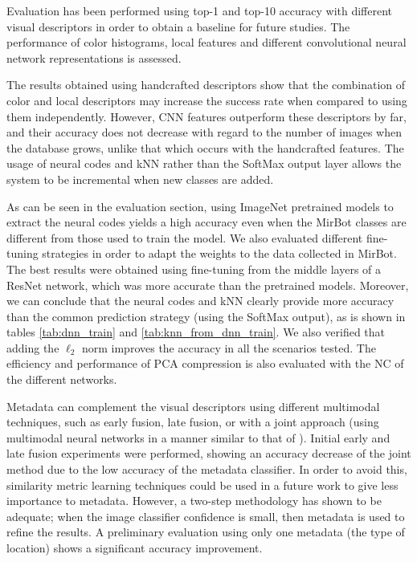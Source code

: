 \documentclass[final, twocolumn]{elsarticle}
\begin{document}
Evaluation has been performed using top-1 and top-10 accuracy with different visual descriptors in order to obtain a baseline for future studies. The performance of color histograms, local features and different convolutional neural network representations is assessed. 

The results obtained using handcrafted descriptors show that the combination of color and local descriptors may increase the success rate  when compared to using them independently. However, CNN features outperform these descriptors by far, and their accuracy does not decrease with regard to the number of images when the database grows, unlike that which occurs with the handcrafted features.  The usage of neural codes and kNN rather than the SoftMax output layer allows the system to be incremental when new classes are added. 

As can be seen in the evaluation section, using ImageNet pretrained models to extract the neural codes yields a high accuracy even when the MirBot classes are different from those used to train the model. We also evaluated different fine-tuning strategies in order to adapt the weights to the data collected in MirBot. The best results were obtained using fine-tuning from the middle layers of a ResNet network, which was more accurate than the pretrained models. Moreover, we can conclude that the neural codes and kNN clearly provide more accuracy than the common prediction strategy (using the SoftMax output), as is shown in tables \ref{tab:dnn_train} and \ref{tab:knn_from_dnn_train}. We also verified that adding the $\ell_2$ norm improves the accuracy in all the scenarios tested. The efficiency and performance of PCA compression is also evaluated with the NC of the different networks. %




Metadata can complement the visual descriptors using different multimodal techniques, such as early fusion, late fusion, or with a joint approach (using multimodal neural networks in a manner similar to that of \cite{Mao2014ExplainNetworks}). Initial early and late fusion experiments were performed, showing an accuracy decrease of the joint method due to the low accuracy of the metadata classifier. In order to avoid this, similarity metric learning techniques \citep{Bellet2012SimilarityClassification} could be used in a future work to give less importance to metadata. However, a two-step methodology has shown to be adequate; when the image classifier confidence is small, then metadata is used to refine the results. A preliminary evaluation using only one metadata (the type of location) shows a significant accuracy improvement. 
\end{document}
